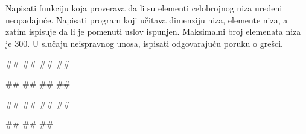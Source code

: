 \begin{Exercise}[label=neopadajuce]
  Napisati funkciju koja proverava da li su elementi celobrojnog niza
  uređeni neopadajuće. 
  Napisati program koji učitava dimenziju niza, elemente niza, a zatim ispisuje
  da li je pomenuti uslov ispunjen. 
  Maksimalni broj elemenata niza je $300$.
U slučaju neispravnog unosa, ispisati odgovarajuću poruku o grešci. 

\begin{miditest}
\begin{upotreba}{1}
#\naslovInt#
##
##
##  
\end{upotreba}
\end{miditest}
\begin{miditest}
\begin{upotreba}{2}
#\naslovInt#
##
##
##  
\end{upotreba}
\end{miditest}

\begin{miditest}
\begin{upotreba}{3}
#\naslovInt#
##
##
##  
\end{upotreba}
\end{miditest}
\begin{miditest}
\begin{upotreba}{4}
#\naslovInt#
##
##  
\end{upotreba}
\end{miditest}

\end{Exercise}

\ifresenja
\begin{Answer}[ref=neopadajuce]
\end{Answer}
\fi


